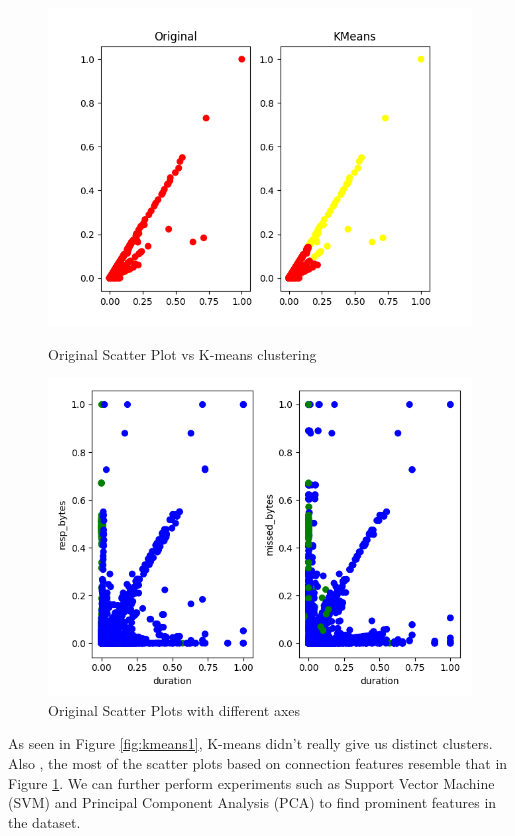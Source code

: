 \begin{figure}[htb]
	\centering
	\includegraphics[width=1\textwidth]{images/kmeans.png}
	\caption{Original Scatter Plot vs K-means clustering} 
	\label{fig:kmeans1}
	
	\centering
	\includegraphics[width=1\textwidth]{images/kmeans2.png}
	\caption{Original Scatter Plots with different axes} 
	\label{fig:kmeans2}
\end{figure}

As seen in Figure \ref{fig:kmeans1}, K-means didn't really give us distinct clusters. Also , the most of the scatter plots based on connection features resemble that in Figure \ref{fig:kmeans2}. We can further perform experiments such as Support Vector Machine (SVM) and Principal Component Analysis (PCA) to find prominent features in the dataset.